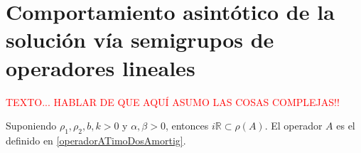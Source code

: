 \section{Comportamiento asintótico de la solución vía semigrupos de operadores lineales}
\label{ch:TimoshenkoFric:section:compAsintoticoSG}

\textcolor{red}{TEXTO... HABLAR DE QUE AQUÍ ASUMO LAS COSAS COMPLEJAS!!}

\begin{Lema}[(Resolvente de $A$)]
\label{ch:TimoshenkoFric:lemma:resolventeA}
    
    Suponiendo $\rho_1, \rho_2, b, k > 0$ y $\alpha,\beta > 0$, entonces $i\mathbb{R} \subset \rho(A)$. El operador $A$ es el definido en \ref{operadorATimoDosAmortig}.
\end{Lema}

